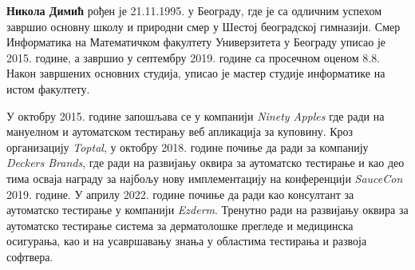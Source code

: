 \documentclass[12pt,oneside]{memoir}
\begin{document}
\literatura

\backmatter

\begin{biografija}
\textbf{Никола Димић} рођен је 21.11.1995. у Београду, где је са одличним успехом завршио основну школу и природни смер у Шестој београдској гимназији. Смер Информатика на Математичком факултету Универзитета у Београду уписао је 2015. године, а завршио у септембру 2019. године са просечном оценом 8.8. Након завршених основних студија, уписао је мастер студије информатике на истом факултету.

У октобру 2015. године запошљава се у компанији \textit{Ninety Apples} где ради на мануелном и аутоматском тестирању веб апликација за куповину. Кроз организацију \textit{Toptal}, у октобру 2018. године почиње да ради за компанију \textit{Deckers Brands}, где ради на развијању оквира за аутоматско тестирање и као део тима осваја награду за најбољу нову имплементацију на конференцији \textit{SauceCon} 2019. године. У априлу 2022. године почиње да ради као консултант за аутоматско тестирање у компанији \textit{Ezderm}. Тренутно ради на развијању оквира за аутоматско тестирање система за дерматолошке прегледе и медицинска осигурања, као и на усавршавању знања у областима тестирања и развоја софтвера.


\end{biografija}
\end{document}
